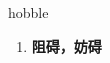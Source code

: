 
\begin{frame}
{\huge hobble}
\begin{center}
\begin{enumerate}\Large
  \item \textbf{阻碍，妨碍}
\end{enumerate}
\end{center}
\end{frame}

